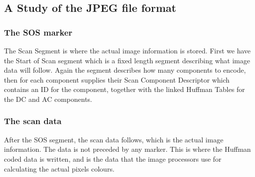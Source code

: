 \begin{infobox}{\section[A Study of the JPEG file format]{A Study of the JPEG file format}}
\subsubsection*{The SOS marker}
\begin{centering}
\end{centering}
The Scan Segment is where the actual image information is stored. First we have the Start of Scan segment which is a fixed length segment describing what image data will follow. Again the segment describes how many components to encode, then for each component supplies their Scan Component Descriptor which contains an ID for the component, together with the linked Huffman Tables for the DC and AC components.

\begin{centering}
\end{centering}

\subsubsection*{The scan data}
After the SOS segment, the scan data follows, which is the actual image information. The data is not preceded by any marker. This is where the Huffman coded data is written, and is the data that the image processors use for calculating the actual pixels colours.


\end{infobox}

